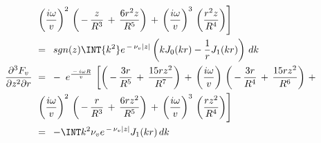 \documentclass{article}
\begin{document}
\begin{equation*}
\begin{aligned}
 &\left. { \left( {\frac{ i \omega   }{ v }}  \right) }^2 \,  \left( \,-\,  \frac{z }{  R^3 } \,+\, \frac{6 r^2   z   }{  R^5 } \right)  \,+\, { \left( {\frac{ i \omega   }{ v }}  \right) }^3 \,  \left( \frac{ r^2   z   }{  R^4 } \right)  \right] \, \\
 \,&=\, \  sgn (z) \INT  { k^2 }  e^{ \,-\, \nu_v |  z | } \left(  k J_0 ( kr ) - \frac{1 }{ r }J_1 ( kr )  \right) \, dk \\
{ \frac{ \partial^3 F_v   }{  \partial {\it z}^2 \partial r } } \   &= \  \,-\,\ { e^{ \frac{ \,-\,i \omega R   }{ v }} } \, \left[  \left( \,-\, \frac{ 3 r   }{  R^5 } \,+\, \frac{ 15 r   z^2   }{  R^7 } \right)  \,+\, { \left( {\frac{ i \omega   }{ v }}  \right) } \,  \left( \,-\, \frac{ 3 r   }{  R^4 } \,+\, \frac{ 15 r   z^2   }{  R^6 } \right)  \,+\,  \right . \\
 &\left. { \left( {\frac{ i \omega   }{ v }}  \right) }^2 \,  \left( \,-\, \frac{ r   }{  R^3 } \,+\, \frac{ 6 r   z^2   }{  R^5 } \right)  \,+\, { \left( {\frac{ i \omega   }{ v }}  \right) }^3 \,  \left( \frac{ r   z^2   }{  R^4 } \right)  \right] \, \\
 \,&=\, \   -  \INT  k^2 \nu_v  e^{ \,-\, \nu_v |  z | } J_1 ( kr ) \, dk 
\end{aligned}
\end{equation*}
\end{document}
